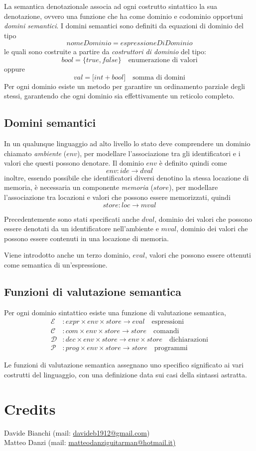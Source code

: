 \documentclass[a4paper, 10pt]{article}
\begin{document}
	La semantica denotazionale associa ad ogni costrutto sintattico la sua denotazione, ovvero una funzione che ha come dominio e codominio opportuni \textit{domini semantici}.
	I domini semantici sono definiti da equazioni di dominio del tipo 
	\[
	nomeDominio = espressioneDiDominio
	\] 
	le quali sono costruite a partire da \textit{costruttori di dominio} del tipo:
	\[
	bool = \lbrace true, false \rbrace \quad \text{enumerazione di valori}
	\]
	oppure 
	\[
	val = \lbrack int + bool \rbrack \quad \text{somma di domini}
	\]
	Per ogni dominio esiste un metodo per garantire un ordinamento parziale degli stessi, garantendo che ogni dominio sia effettivamente un reticolo completo.
	
	\subsection{Domini semantici}
	In un qualunque linguaggio ad alto livello lo stato deve comprendere un dominio chiamato \textit{ambiente} ($env$), per modellare l'associazione tra gli identificatori e i valori che questi possono denotare. Il dominio $env$ è definito quindi come $$env:ide \to dval$$ inoltre, essendo possibile che identificatori diversi denotino la stessa locazione di memoria, è necessaria un componente \textit{memoria} ($store$), per modellare l'associazione tra locazioni e valori che possono essere memorizzati, quindi 
	\[
	store:loc \to mval
	\]
	
	Precedentemente sono stati specificati anche $dval$, dominio dei valori che possono essere denotati da un identificatore nell'ambiente e $mval$, dominio dei valori che possono essere contenuti in una locazione di memoria.
	
	Viene introdotto anche un terzo dominio, $eval$, valori che possono essere ottenuti come semantica di un'espressione.
	
	\subsection{Funzioni di valutazione semantica}
	Per ogni dominio sintattico esiste una funzione di valutazione semantica, 
	\begin{align*}
	\mathcal{E}&:expr \times env \times store \to eval \quad \text{espressioni} \\
	\mathcal{C}&:com \times env \times store \to store \quad \text{comandi} \\
	\mathcal{D}&:dec \times env \times store \to env \times store \quad \text{dichiarazioni} \\
	\mathcal{P}&:prog \times env \times store \to store \quad \text{programmi}
	\end{align*}
	
	
	Le funzioni di valutazione semantica assegnano uno specifico significato ai vari costrutti del linguaggio, con una definizione data sui casi della sintassi astratta.
	\newpage
	
	\section{Credits}
	Davide Bianchi (mail: \url{davideb1912@gmail.com}) \\
	Matteo Danzi (mail: \url{matteodanziguitarman@hotmail.it)}
	
\end{document}
